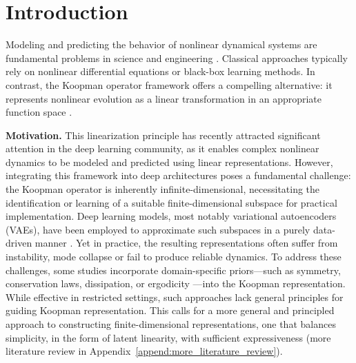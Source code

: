 \documentclass{article} %
\begin{document}
\section{Introduction}
Modeling and predicting the behavior of nonlinear dynamical systems are fundamental problems in science and engineering \citep{brunton2020machine, kovachki2023neural, mezic2020koopman}. Classical approaches typically rely on nonlinear differential equations or black-box learning methods. In contrast, the Koopman operator framework offers a compelling alternative: it represents nonlinear evolution as a linear transformation in an appropriate function space \citep{koopman1931hamiltonian, fritz1995john}.

\textbf{Motivation.} This linearization principle has recently attracted significant attention in the deep learning community, as it enables complex nonlinear dynamics to be modeled and predicted using linear representations. However, integrating this framework into deep architectures poses a fundamental challenge: the Koopman operator is inherently infinite-dimensional, necessitating the identification or learning of a suitable finite-dimensional subspace for practical implementation. Deep learning models, most notably variational autoencoders (VAEs), have been employed to approximate such subspaces in a purely data-driven manner \citep{otto2019linearly, pan2020physics, liu2023koopa}. Yet in practice, the resulting representations often suffer from instability, mode collapse or fail to produce reliable dynamics. To address these challenges, some studies incorporate domain-specific priors—such as symmetry, conservation laws, dissipation, or ergodicity \citep{vaidya2008lyapunov, weissenbacher2022koopman, azencot2020forecasting, cheng2025learning}—into the Koopman representation. While effective in restricted settings, such approaches lack general principles for guiding Koopman representation. This calls for a more general and principled approach to constructing finite-dimensional representations, one that balances simplicity, in the form of latent linearity, with sufficient expressiveness (more literature review in Appendix~\ref{append:more_literature_review}). 
\end{document}
